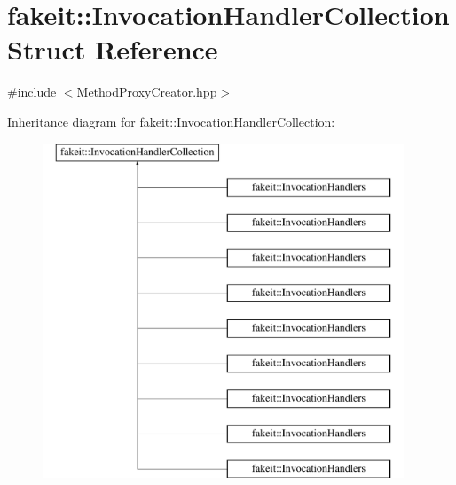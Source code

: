 \hypertarget{structfakeit_1_1InvocationHandlerCollection}{}\section{fakeit\+::Invocation\+Handler\+Collection Struct Reference}
\label{structfakeit_1_1InvocationHandlerCollection}


{\ttfamily \#include $<$Method\+Proxy\+Creator.\+hpp$>$}

Inheritance diagram for fakeit\+::Invocation\+Handler\+Collection\+:\begin{figure}[H]
\begin{center}
\leavevmode
\includegraphics[height=10.000000cm]{structfakeit_1_1InvocationHandlerCollection}
\end{center}
\end{figure}
